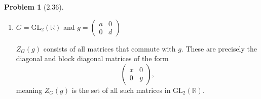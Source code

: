 \documentclass[12pt]{article}
\theoremstyle{definition}
\newtheorem{problem}{Problem}
\begin{document}
\begin{problem}[2.36]
\begin{enumerate}[label=(\alph*)]
\begin{enumerate}[label=(\roman*)]
\begin{solution}
            \end{solution}
            \item $G = \text{GL}_2(\mathbb{R})$ and $g = \begin{pmatrix} a & 0 \\ 0 & d \end{pmatrix}$
            
            \begin{solution}
                $Z_G(g)$ consists of all matrices that commute with $g$. These are precisely the diagonal and block diagonal matrices of the form \[ \begin{pmatrix} x & 0 \\ 0 & y \end{pmatrix}, \] meaning $Z_G(g)$ is the set of all such matrices in $\text{GL}_2(\mathbb{R})$.

            \end{solution}
        \end{enumerate}
    \end{enumerate}
\end{problem}
\end{document}
